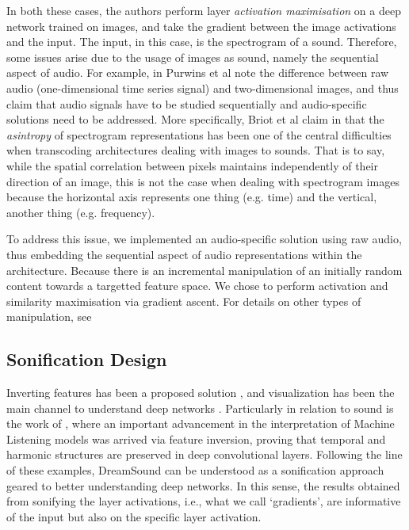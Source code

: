 \documentclass[a4paper,10pt,oneside]{article}
\begin{document}
\begin{sloppy}
In both these cases, the authors perform layer \textit{activation maximisation} on a deep network trained on images, and take the gradient between the image activations and the input. The input, in this case, is the spectrogram of a sound. Therefore, some issues arise due to the usage of images as sound, namely the sequential aspect of audio. For example, in \cite{2019Purwins} Purwins et al note the difference between raw audio (one-dimensional time series signal) and two-dimensional images, and thus claim that audio signals have to be studied sequentially and audio-specific solutions need to be addressed. More specifically, Briot et al claim in \cite{Briot2017}that the \textit{asintropy} of spectrogram representations has been one of the central difficulties when transcoding architectures dealing with images to sounds. That is to say, while the spatial correlation between pixels maintains independently of their direction of an image, this is not the case when dealing with spectrogram images because the horizontal axis represents one thing (e.g. time) and the vertical, another thing (e.g. frequency). 

To address this issue, we implemented an audio-specific solution using raw audio, thus embedding the sequential aspect of audio representations within the architecture. Because there is an incremental manipulation of an initially random content towards a targetted feature space. We chose to perform activation and similarity maximisation via gradient ascent. For details on other types of manipulation, see \cite{Briot2017}

\subsection{Sonification Design}
Inverting features has been a proposed solution \cite{mahendran2014understanding, dosovitskiy2016inverting}, and visualization has been the main channel to understand deep networks \cite{simonyan2014deep}. Particularly in relation to sound is the work of \cite{saumitra_mishra_2018_1492527}, where an important advancement in the interpretation of Machine Listening models was arrived via feature inversion, proving that temporal and harmonic structures are preserved in deep convolutional layers. Following the line of these examples, DreamSound can be understood as a sonification approach geared to better understanding deep networks. In this sense, the results obtained from sonifying the layer activations, i.e., what we call `gradients', are informative of the input but also on the specific layer activation. 


\end{sloppy}
\end{document}
